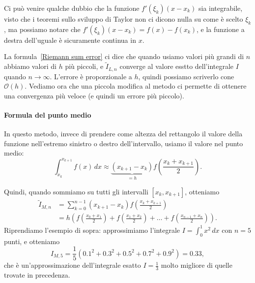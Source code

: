 \documentclass[a4paper]{report}
\theoremstyle{definiton}
\theoremstyle{remark}
\newcommand{\x}{\mathbf{x}}
\begin{document}
Ci può venire qualche dubbio che la funzione $f'(\xi_k)(x - x_k)$ sia integrabile, visto che i teoremi sullo sviluppo di Taylor non ci dicono nulla su come è scelto $\xi_k$, ma possiamo notare che $f'(\xi_k)(x - x_k) = f(x) - f(x_k)$, e la funzione a destra dell'uguale è sicuramente continua in $x$.

La formula~\eqref{Riemann sum error} ci dice che quando usiamo valori più grandi di $n$ abbiamo valori di $h$ più piccoli, e $\tilde{I}_{L,n}$ converge al valore esstto dell'integrale $I$ quando $n\to \infty$. L'errore è proporzionale a $h$, quindi possiamo scriverlo cone $\mathcal{O}(h)$. Vediamo ora che una piccola modifica al metodo ci permette di ottenere una convergenza più veloce (e quindi un errore più piccolo).

\paragraph{Formula del punto medio}
In questo metodo, invece di prendere come altezza del rettangolo il valore della funzione nell'estremo sinistro o destro dell'intervallo, usiamo il valore nel punto medio:
\begin{equation} \label{formula del punto medio}
    \int_{x_k}^{x_{k+1}} f(x) \, dx \approx \underbrace{(x_{k+1}-x_k)}_{=h} f\left(\frac{x_k + x_{k+1}}{2}\right).    
\end{equation}
\begin{center}
\end{center}

Quindi, quando sommiamo su tutti gli intervalli $[x_k,x_{k+1}]$, otteniamo
\begin{align*}
\tilde{I}_{M,n} &= \sum_{k=0}^{n-1} (x_{k+1}-x_k) f\left(\frac{x_k + x_{k+1}}{2}\right) \\
&= h \left(f\left(\frac{x_0 + x_{1}}{2}\right) + f\left(\frac{x_1 + x_{2}}{2}\right) + \dots + f\left(\frac{x_{n-1} + x_{n}}{2}\right)\right).
\end{align*}
Riprendiamo l'esempio di sopra: approssimiamo l'integrale $I = \int_0^1 x^2\, dx$ con $n=5$ punti, e otteniamo
\[
I_{M,5} = \frac{1}{5}\left(0.1^2+0.3^2+0.5^2+0.7^2+0.9^2\right) = 0.33,
\]
che è un'approssimazione dell'integrale esatto $I=\frac{1}{3}$ molto migliore di quelle trovate in precedenza.
\end{document}
